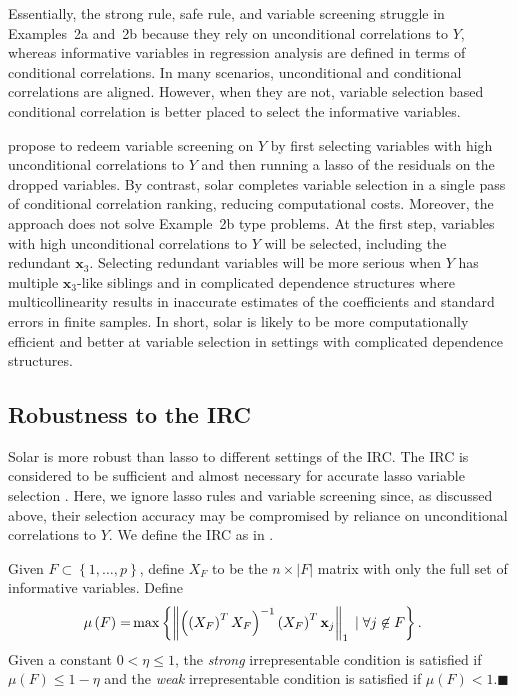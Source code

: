 \documentclass[11pt,review,authoryear]{elsarticle}
\begin{document}
\bigskip
Essentially, the strong rule, safe rule, and variable screening struggle in Examples~2a and~2b because they rely on unconditional correlations to $Y$, whereas informative variables in regression analysis are defined in terms of conditional correlations. In many scenarios, unconditional and conditional correlations are aligned. However, when they are not, variable selection based conditional correlation is better placed to select the informative variables.

\citet{fan2008sure} propose to redeem variable screening on $Y$ by first selecting variables with high unconditional correlations to $Y$ and then running a lasso of the residuals on the dropped variables. By contrast, solar completes variable selection in a single pass of conditional correlation ranking, reducing computational costs. Moreover, the \citet{fan2008sure} approach does not solve Example~2b type problems. At the first step, variables with high unconditional correlations to $Y$ will be selected, including the redundant $\mathbf{x}_3$. Selecting redundant variables will be more serious when $Y$ has multiple $\mathbf{x}_3$-like siblings and in complicated dependence structures where multicollinearity results in inaccurate estimates of the coefficients and standard errors in finite samples. In short, solar is likely to be more computationally efficient and better at variable selection in settings with complicated dependence structures.


\subsection{Robustness to the IRC \label{subsection:irc}}

Solar is more robust than lasso to different settings of the IRC. The IRC is considered to be sufficient and almost necessary for accurate lasso variable selection \citep{zhang09}. Here, we ignore lasso rules and variable screening since, as discussed above, their selection accuracy may be compromised by reliance on unconditional correlations to $Y$. We define the IRC as in \citet{zhang09}.

\begin{definition}[IRC]
  Given $F \subset \left\{ 1, \ldots, p \right\}$, define $X_F$ to be the $n \times \left\vert F \right \vert$ matrix with only the full set of informative variables. Define
    \begin{align}
    \mu \left( F \right) = & \max \left\{ \left\Vert \left( \left( X_F \right)^T X_F \right)^{-1} \left( X_F \right)^T \mathbf{x}_j \right\Vert_1 \; \vert \; \forall j \not\in F \right\}. \notag
    \end{align}
  Given a constant $0 < \eta \leqslant 1$, the \emph{strong} irrepresentable condition is satisfied if $\mu \left( F \right) \leqslant 1 - \eta$ and the \emph{weak} irrepresentable condition is satisfied if $\mu \left( F \right) < 1$.$\blacksquare$
\end{definition}
\end{document}
